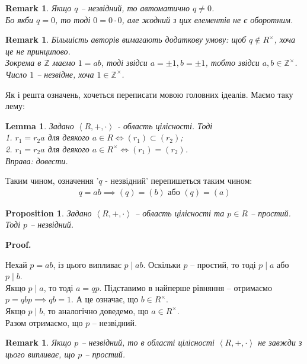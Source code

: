 \documentclass[a4paper, 10pt]{article}
\makeatletter
\theoremstyle{theoremdd}
\theoremstyle{theoremdd}
\theoremstyle{theoremdd}
\theoremstyle{theoremdd}
\theoremstyle{theoremdd}
\theoremstyle{theoremdd}
\theoremstyle{theoremdd}
\theoremstyle{theoremdd}
\theoremstyle{theoremdd}
\newtheorem{proposition}[theorem]{Proposition}
\theoremstyle{theoremdd}
\theoremstyle{theoremdd}
\newtheorem{remark}[theorem]{Remark}
\theoremstyle{theoremdd}
\theoremstyle{theoremdd}
\newtheorem{lemma}[theorem]{Lemma}
\theoremstyle{theoremdd}
\theoremstyle{theoremdd}
\renewenvironment{proof}[1][Proof.\\]{\par
\pushQED{\hfill \qed}%
\normalfont \topsep6\p@\@plus6\p@\relax
\trivlist
\item\relax
{\bfseries
#1\@addpunct{.}}\hspace\labelsep\ignorespaces
}{%
\popQED\endtrivlist\@endpefalse
}
\makeatother
\begin{document}
\begin{remark}
Якщо $q$ -- незвідний, то автоматично $q \neq 0$.\\
Бо якби $q = 0$, то тоді $0 = 0 \cdot 0$, але жодний з цих елементів не є оборотним.
\end{remark}

\begin{remark}
Більшість авторів вимагають додаткову умову: щоб $q \notin R^\times$, хоча це не принципово.\\
Зокрема в $\mathbb{Z}$ маємо $1 = ab$, тоді звідси $a = \pm 1, b = \pm 1$, тобто звідси $a,b \in \mathbb{Z}^\times$. Число $1$ -- незвідне, хоча $1 \in \mathbb{Z}^\times$.
\end{remark}

\noindent Як і решта означень, хочеться переписати мовою головних ідеалів. Маємо таку лему:
\begin{lemma}
Задано $\left<R,+,\cdot \right>$ - область цілісності. Тоді\\
1. $r_1 = r_2a$ для деякого $a \in R \iff (r_1) \subset (r_2)$;\\
2. $r_1 = r_2a$ для деякого $a \in R^\times \iff (r_1) = (r_2)$.\\
\textit{Вправа: довести.}
\end{lemma}

Таким чином, означення '$q$ - незвідний' перепишеться таким чином:
\begin{align*}
q = ab \implies (q) = (b) \text{ або } (q) = (a)
\end{align*}

\begin{proposition}
Задано $\left<R,+,\cdot \right>$ -- область цілісності та $p \in R$ -- простий. Тоді $p$ -- незвідний.
\end{proposition}

\begin{proof}
Нехай $p = ab$, із цього випливає $p \mid ab$. Оскільки $p$ -- простий, то тоді $p \mid a$ або $p \mid b$.\\
Якщо $p \mid a$, то тоді $a = qp$. Підставимо в найперше рівняння -- отримаємо $p = qbp \implies qb = 1$. А це означає, що $b \in R^\times$.\\
Якщо $p \mid b$, то аналогічно доведемо, що $a \in R^\times$.\\
Разом отримаємо, що $p$ -- незвідний.
\end{proof}

\begin{remark}
Якщо $p$ -- незвідний, то в області цілісності $\left<R,+,\cdot \right>$ не завжди з цього випливає, що $p$ -- простий.
\end{remark}
\end{document}
